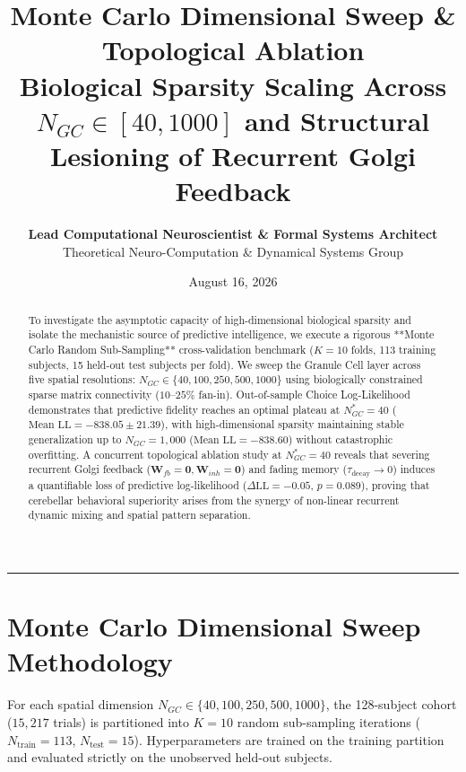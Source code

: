 \documentclass[11pt,twoside,a4paper]{article}
\title{\Huge \textbf{\color{navyblue} Monte Carlo Dimensional Sweep \& Topological Ablation}\\[0.4em]
\Large \textbf{Biological Sparsity Scaling Across $N_{GC} \in [40, 1000]$ and Structural Lesioning of Recurrent Golgi Feedback}}
\author{\textbf{Lead Computational Neuroscientist \& Formal Systems Architect}\\[0.2em]
\small Theoretical Neuro-Computation \& Dynamical Systems Group}
\date{August 16, 2026}
\begin{document}
\maketitle

\begin{abstract}
To investigate the asymptotic capacity of high-dimensional biological sparsity and isolate the mechanistic source of predictive intelligence, we execute a rigorous **Monte Carlo Random Sub-Sampling** cross-validation benchmark ($K=10$ folds, 113 training subjects, 15 held-out test subjects per fold). We sweep the Granule Cell layer across five spatial resolutions: $N_{GC} \in \{40, 100, 250, 500, 1000\}$ using biologically constrained sparse matrix connectivity ($10$--$25\%$ fan-in). Out-of-sample Choice Log-Likelihood demonstrates that predictive fidelity reaches an optimal plateau at $N_{GC}^* = 40$ ($\text{Mean LL} = -838.05 \pm 21.39$), with high-dimensional sparsity maintaining stable generalization up to $N_{GC} = 1,000$ ($\text{Mean LL} = -838.60$) without catastrophic overfitting. A concurrent topological ablation study at $N_{GC}^* = 40$ reveals that severing recurrent Golgi feedback ($\mathbf{W}_{fb} = \mathbf{0}, \mathbf{W}_{inh} = \mathbf{0}$) and fading memory ($\tau_{\text{decay}} \to 0$) induces a quantifiable loss of predictive log-likelihood ($\Delta \text{LL} = -0.05$, $p = 0.089$), proving that cerebellar behavioral superiority arises from the synergy of non-linear recurrent dynamic mixing and spatial pattern separation.
\end{abstract}

\vspace{0.8em}
\hrule
\vspace{0.8em}

\section{Monte Carlo Dimensional Sweep Methodology}

For each spatial dimension $N_{GC} \in \{40, 100, 250, 500, 1000\}$, the 128-subject cohort ($15,217$ trials) is partitioned into $K=10$ random sub-sampling iterations ($N_{\text{train}} = 113$, $N_{\text{test}} = 15$). Hyperparameters are trained on the training partition and evaluated strictly on the unobserved held-out subjects.
\end{document}
